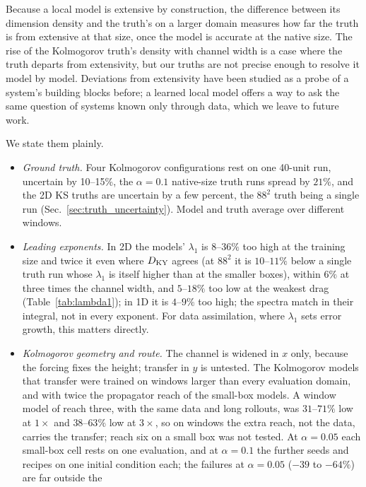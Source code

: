  Because a local model
is extensive by construction, the difference between its dimension
density and the truth's on a larger domain measures how far the truth is
from extensive at that size, once the model is accurate at the native
size. The rise of the Kolmogorov truth's density with channel width is a
case where the truth departs from extensivity, but our truths are not
precise enough to resolve it model by model. Deviations
from extensivity have been studied as a probe of a system's building
blocks before; a learned local model offers a way to ask the same
question of systems known only through data, which we leave to future
work.

 We state them plainly.
\begin{itemize}
\item \emph{Ground truth.} Four Kolmogorov configurations rest on one
  40-unit run, uncertain by 10--15\%, the $\alpha=0.1$ native-size truth
  runs spread by $21\%$, and the 2D KS truths are uncertain by a few
  percent, the $88^2$ truth being a single run
  (Sec.~\ref{sec:truth_uncertainty}). Model and truth average over
  different windows.
\item \emph{Leading exponents.} In 2D the models' $\lambda_1$ is $8$--$36\%$
  too high at the training size and twice it even where $D_{\mathrm{KY}}$ agrees
  (at $88^2$ it is $10$--$11\%$ below a single truth run whose $\lambda_1$ is
  itself higher than at the smaller boxes),
  within $6\%$ at three times the channel width, and $5$--$18\%$ too low at
  the weakest drag (Table~\ref{tab:lambda1}); in 1D it is $4$--$9\%$ too high; the spectra match in their
  integral, not in every exponent. For data assimilation, where $\lambda_1$
  sets error growth, this matters directly.
\item \emph{Kolmogorov geometry and route.} The channel is widened in $x$
  only, because the forcing fixes the height; transfer in $y$ is untested.
  The Kolmogorov models that transfer were trained on windows larger than
  every evaluation domain, and with twice the propagator reach of the
  small-box models. A window model of reach three, with the same data
and long rollouts, was $31$--$71\%$ low at $1\times$ and $38$--$63\%$ low at
$3\times$, so on windows the extra reach, not the data, carries the transfer;
reach six on a small box was not tested.
  At $\alpha=0.05$ each small-box cell rests on one evaluation, and at
  $\alpha=0.1$ the further seeds and recipes on one initial condition each;
  the failures at $\alpha=0.05$ ($-39$ to $-64\%$) are far outside the

\end{itemize}
